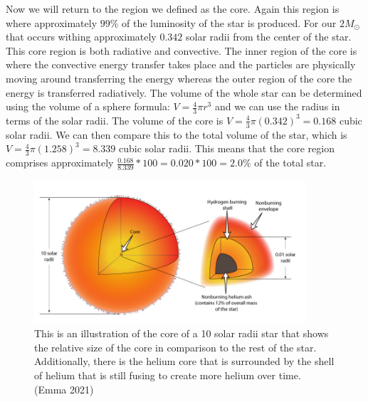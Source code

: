 \documentclass{article}
\begin{document}
\begin{multicols}{2}

Now we will return to the region we defined as the core. Again this region is where approximately $99\%$ of the luminosity of the star is produced. For our $2M_\odot$ that occurs withing approximately $0.342$ solar radii from the center of the star. This core region is both radiative and convective. The inner region of the core is where the convective energy transfer takes place and the particles are physically moving around transferring the energy whereas the outer region of the core the energy is transferred radiatively. The volume of the whole star can be determined using the volume of a sphere formula: $V = \frac{4}{3}\pi r^3$ and we can use the radius in terms of the solar radii. The volume of the core is $V = \frac{4}{3}\pi (0.342)^3 = 0.168$ cubic solar radii. We can then compare this to the total volume of the star, which is $V = \frac{4}{3} \pi (1.258)^3 = 8.339$ cubic solar radii. This means that the core region comprises approximately $\frac{0.168}{8.339}*100 = 0.020*100 = 2.0\%$ of the total star. 

\end{multicols}

\begin{figure}
  \centering
  \includegraphics[width=0.9\textwidth]{Core.jpg}
  \caption{This is an illustration of the core of a 10 solar radii star that shows the relative size of the core in comparison to the rest of the star. Additionally, there is the helium core that is surrounded by the shell of helium that is still fusing to create more helium over time. (Emma 2021)}
  \label{fig:core}
\end{figure}
\end{document}

